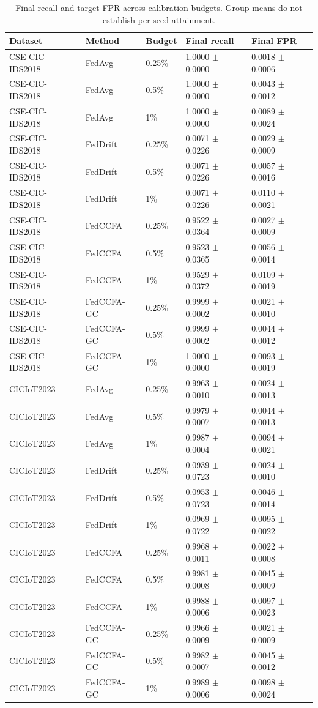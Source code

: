 \begin{table}[t]
\centering
\small
\setlength{\tabcolsep}{3pt}
\caption{Final recall and target FPR across calibration budgets. Group means do not establish per-seed attainment.}
\label{tab:calibration_sensitivity}
\begin{tabular}{lllll}
\hline
Dataset & Method & Budget & Final recall & Final FPR \\
\hline
CSE-CIC-IDS2018 & FedAvg & 0.25\% & 1.0000 $\pm$ 0.0000 & 0.0018 $\pm$ 0.0006 \\
CSE-CIC-IDS2018 & FedAvg & 0.5\% & 1.0000 $\pm$ 0.0000 & 0.0043 $\pm$ 0.0012 \\
CSE-CIC-IDS2018 & FedAvg & 1\% & 1.0000 $\pm$ 0.0000 & 0.0089 $\pm$ 0.0024 \\
CSE-CIC-IDS2018 & FedDrift & 0.25\% & 0.0071 $\pm$ 0.0226 & 0.0029 $\pm$ 0.0009 \\
CSE-CIC-IDS2018 & FedDrift & 0.5\% & 0.0071 $\pm$ 0.0226 & 0.0057 $\pm$ 0.0016 \\
CSE-CIC-IDS2018 & FedDrift & 1\% & 0.0071 $\pm$ 0.0226 & 0.0110 $\pm$ 0.0021 \\
CSE-CIC-IDS2018 & FedCCFA & 0.25\% & 0.9522 $\pm$ 0.0364 & 0.0027 $\pm$ 0.0009 \\
CSE-CIC-IDS2018 & FedCCFA & 0.5\% & 0.9523 $\pm$ 0.0365 & 0.0056 $\pm$ 0.0014 \\
CSE-CIC-IDS2018 & FedCCFA & 1\% & 0.9529 $\pm$ 0.0372 & 0.0109 $\pm$ 0.0019 \\
CSE-CIC-IDS2018 & FedCCFA-GC & 0.25\% & 0.9999 $\pm$ 0.0002 & 0.0021 $\pm$ 0.0010 \\
CSE-CIC-IDS2018 & FedCCFA-GC & 0.5\% & 0.9999 $\pm$ 0.0002 & 0.0044 $\pm$ 0.0012 \\
CSE-CIC-IDS2018 & FedCCFA-GC & 1\% & 1.0000 $\pm$ 0.0000 & 0.0093 $\pm$ 0.0019 \\
CICIoT2023 & FedAvg & 0.25\% & 0.9963 $\pm$ 0.0010 & 0.0024 $\pm$ 0.0013 \\
CICIoT2023 & FedAvg & 0.5\% & 0.9979 $\pm$ 0.0007 & 0.0044 $\pm$ 0.0013 \\
CICIoT2023 & FedAvg & 1\% & 0.9987 $\pm$ 0.0004 & 0.0094 $\pm$ 0.0021 \\
CICIoT2023 & FedDrift & 0.25\% & 0.0939 $\pm$ 0.0723 & 0.0024 $\pm$ 0.0010 \\
CICIoT2023 & FedDrift & 0.5\% & 0.0953 $\pm$ 0.0723 & 0.0046 $\pm$ 0.0014 \\
CICIoT2023 & FedDrift & 1\% & 0.0969 $\pm$ 0.0722 & 0.0095 $\pm$ 0.0022 \\
CICIoT2023 & FedCCFA & 0.25\% & 0.9968 $\pm$ 0.0011 & 0.0022 $\pm$ 0.0008 \\
CICIoT2023 & FedCCFA & 0.5\% & 0.9981 $\pm$ 0.0008 & 0.0045 $\pm$ 0.0009 \\
CICIoT2023 & FedCCFA & 1\% & 0.9988 $\pm$ 0.0006 & 0.0097 $\pm$ 0.0023 \\
CICIoT2023 & FedCCFA-GC & 0.25\% & 0.9966 $\pm$ 0.0009 & 0.0021 $\pm$ 0.0009 \\
CICIoT2023 & FedCCFA-GC & 0.5\% & 0.9982 $\pm$ 0.0007 & 0.0045 $\pm$ 0.0012 \\
CICIoT2023 & FedCCFA-GC & 1\% & 0.9989 $\pm$ 0.0006 & 0.0098 $\pm$ 0.0024 \\
\hline
\end{tabular}
\end{table}
